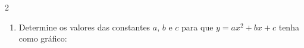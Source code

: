 \documentclass[a4paper,14pt]{article}
\begin{document}
\begin{multicols}{2}
\begin{enumerate}
\begin{enumerate}[a)]
		    	\item $(x - 2)(y + 4) = 0$ \\\\\\\\\\\\\\\\\\\\\\\\\\\\
		    	\item $x^2 = y^2$ \\\\\\\\\\\\\\\\\\\\\\\\\\\\\\\\
		    \end{enumerate}
	        \item Determine os valores das constantes $a$, $b$ e $c$ para que $y = ax^2 + bx + c$ tenha como gráfico:

\end{enumerate}
\end{multicols}
\end{document}

